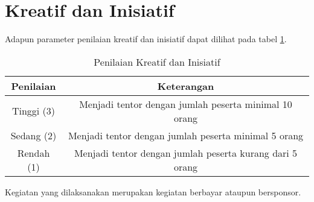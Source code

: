 \section{Kreatif dan Inisiatif}

Adapun parameter penilaian kreatif dan inisiatif dapat dilihat pada tabel \ref{tab:nilaikreatifinisiatif}.

\begin{table}[h]
\caption{Penilaian Kreatif dan Inisiatif}
\centering
\begin{tabular}{|c|c|}
\hline
Penilaian&Keterangan\\
\hline
Tinggi (3)&Menjadi tentor dengan jumlah peserta minimal 10 orang\\
\hline
Sedang (2)&Menjadi tentor dengan jumlah peserta minimal 5 orang\\
\hline
Rendah (1)&Menjadi tentor dengan jumlah peserta kurang dari 5 orang\\
\hline
\end{tabular}
\label{tab:nilaikreatifinisiatif}
\end{table}

Kegiatan yang dilaksanakan merupakan kegiatan berbayar ataupun bersponsor.